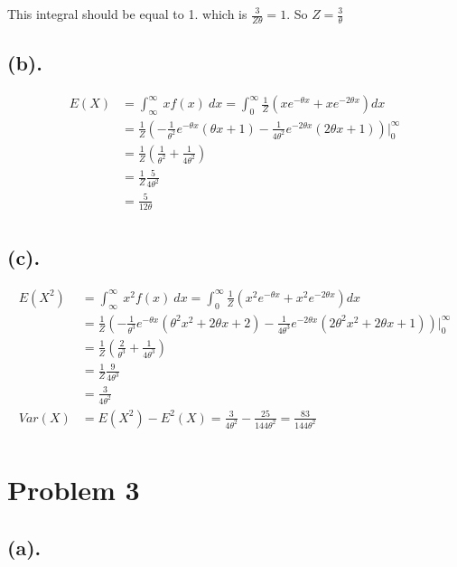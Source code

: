 \documentclass[11pt]{article}
\begin{document}
    This integral should be equal to 1. which is \(\frac{3}{Z\theta}=1\). So
\(Z=\frac{3}{\theta}\)

    \hypertarget{b.}{%
\subsection{(b).}\label{b.}}

\begin{align*}
E(X)&=\int^{\infty}_{\infty}~xf(x)~dx = \int_{0}^{\infty}\frac{1}{Z}(xe^{-\theta x}+xe^{-2\theta x})dx\\
&=\frac{1}{Z} (-\frac{1}{\theta^2} e^{-\theta x}(\theta x+1)-\frac{1}{4\theta^2} e^{-2\theta x}(2\theta x+1))\Big|_0^\infty\\
&=\frac{1}{Z}(\frac{1}{\theta^2}+\frac{1}{4\theta^2})\\
&=\frac{1}{Z}\frac{5}{4\theta^2}\\
&=\frac{5}{12\theta}\\
\end{align*}

    \hypertarget{c.}{%
\subsection{(c).}\label{c.}}

\begin{align*}
E(X^2)&=\int^{\infty}_{\infty}~x^2f(x)~dx = \int_{0}^{\infty}\frac{1}{Z}(x^2e^{-\theta x}+x^2e^{-2\theta x})dx\\
&=\frac{1}{Z} (-\frac{1}{\theta^3} e^{-\theta x}(\theta^2 x^2+2\theta x+2)-\frac{1}{4\theta^3} e^{-2\theta x}(2\theta^2 x^2+2\theta x+1))\Big|_0^\infty\\
&=\frac{1}{Z}(\frac{2}{\theta^3}+\frac{1}{4\theta^3})\\
&=\frac{1}{Z}\frac{9}{4\theta^3}\\
&=\frac{3}{4\theta^2}\\
Var(X)&=E(X^2)-E^2(X)=\frac{3}{4\theta^2}-\frac{25}{144\theta^2}=\frac{83}{144\theta^2}\\
\end{align*}

    \hypertarget{problem-3}{%
\section{Problem 3}\label{problem-3}}

    \hypertarget{a.}{%
\subsection{(a).}\label{a.}}
\end{document}
